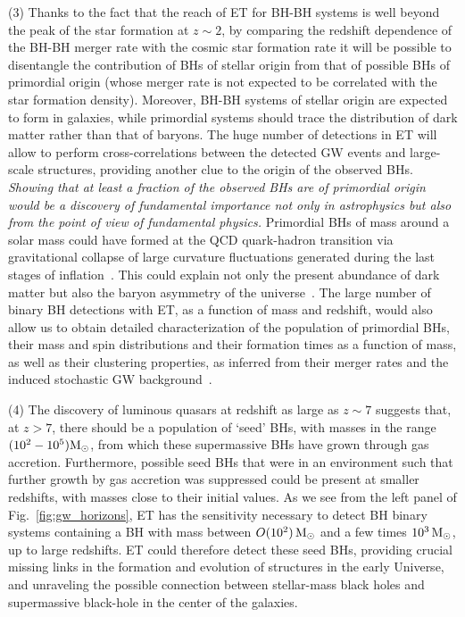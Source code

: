 \vspace{1mm}\noindent
(3) Thanks to the fact that the  reach of ET for BH-BH systems is well beyond the peak of the star formation  at $z\sim 2$, by comparing the redshift dependence of the BH-BH merger rate with the cosmic star formation rate it will be possible  to disentangle the contribution of BHs of stellar origin from that of  possible BHs of  primordial origin  (whose merger rate is not expected to be correlated with the star formation density). Moreover, BH-BH systems of stellar origin are expected to form in galaxies, while primordial systems should trace the distribution of dark matter rather than that of baryons. The huge number of detections in ET will allow to perform cross-correlations between the detected GW events and large-scale structures, providing another clue to the origin of the observed BHs.
{\em Showing that at least a fraction of the observed BHs are of primordial origin would be a discovery of fundamental importance not only in astrophysics but also from the point of view of fundamental physics. }Primordial BHs of mass around a solar mass could have formed at the QCD quark-hadron transition via gravitational collapse of large curvature fluctuations generated during the 
last stages of inflation~\cite{Carr:2019hud}. This could explain not only the present abundance of dark matter but also the baryon asymmetry of the universe~\cite{Garcia-Bellido:2019vlf}. The large number of binary BH detections with ET, as a function of mass and redshift, would also allow us to obtain detailed characterization of the population of primordial BHs, their mass and spin distributions and their formation times as a function of mass, as well as their clustering properties, as inferred from their merger rates and the induced stochastic GW background~\cite{Clesse:2016vqa,Clesse:2016ajp,Garcia-Bellido:2017fdg}.

\vspace{1mm}\noindent
(4) The discovery of luminous quasars at redshift as large as $z\sim 7$ suggests that,  at  $z>7$, there should be a population of `seed' BHs, with masses in the range  $(10^2-10^5) \mathrm{M}_{\odot}$, from which these supermassive BHs have grown through gas accretion.   Furthermore, possible seed BHs that were in an environment such that further growth by gas accretion was suppressed could  be present at smaller redshifts, with masses close to their initial values.
As we see from the left panel of Fig.~\ref{fig:gw_horizons}, ET has the sensitivity necessary to detect  BH binary systems containing  a  BH with mass between  $O(10^2)\,   \mathrm{M}_{\odot}$ and  a few times $10^3\,\mathrm{M}_{\odot}$, up to large redshifts.  ET could therefore detect these seed BHs, providing crucial missing links in the formation and evolution of structures in the early Universe, and  unraveling the possible connection between stellar-mass black holes and supermassive black-hole in the center of the galaxies.

